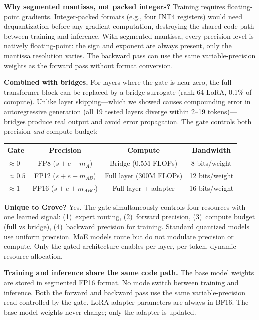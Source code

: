 \documentclass{article}
\begin{document}
\textbf{Why segmented mantissa, not packed integers?}
Training requires floating-point gradients. Integer-packed formats
(e.g., four INT4 registers) would need dequantization before any
gradient computation, destroying the shared code path between training
and inference. With segmented mantissa, every precision level is natively
floating-point: the sign and exponent are always present, only the
mantissa resolution varies. The backward pass can use the same
variable-precision weights as the forward pass without format conversion.

\textbf{Combined with bridges.} For layers where the gate is near zero,
the full transformer block can be replaced by a bridge surrogate
(rank-64 LoRA, 0.1\% of compute). Unlike layer skipping---which we
showed causes compounding error in autoregressive generation (all 19
tested layers diverge within 2--19 tokens)---bridges produce real
output and avoid error propagation. The gate controls both precision
\emph{and} compute budget:

\begin{center}
\begin{tabular}{@{}lccc@{}}
\toprule
Gate & Precision & Compute & Bandwidth \\
\midrule
$\approx 0$ & FP8 ($s{+}e{+}m_A$) & Bridge (0.5M FLOPs) & 8 bits/weight \\
$\approx 0.5$ & FP12 ($s{+}e{+}m_{AB}$) & Full layer (300M FLOPs) & 12 bits/weight \\
$\approx 1$ & FP16 ($s{+}e{+}m_{ABC}$) & Full layer + adapter & 16 bits/weight \\
\bottomrule
\end{tabular}
\end{center}

\textbf{Unique to Grove?} Yes. The gate simultaneously controls four
resources with one learned signal: (1)~expert routing, (2)~forward
precision, (3)~compute budget (full vs bridge), (4)~backward precision
for training. Standard quantized models use uniform precision. MoE
models route but do not modulate precision or compute. Only the gated
architecture enables per-layer, per-token, dynamic resource allocation.

\textbf{Training and inference share the same code path.} The base model
weights are stored in segmented FP16 format. No mode switch between
training and inference. Both the forward and backward pass use the same
variable-precision read controlled by the gate. LoRA adapter parameters
are always in BF16. The base model weights never change; only the
adapter is updated.
\end{document}

